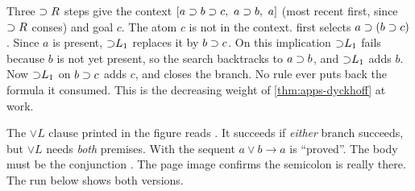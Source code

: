 \begin{tutorial}
Three $\supset R$ steps give the context $[a\supset b\supset c,\ a\supset b,\ a]$ (most recent first, since $\supset R$
conses) and goal $c$. The atom $c$ is not in the context.  first selects
$a\supset(b\supset c)$. Since $a$ is present, ${\supset}L_1$ replaces it by $b\supset c$. On this implication
${\supset}L_1$ fails because $b$ is not yet present, so the search backtracks to $a\supset b$, and ${\supset}L_1$
adds $b$. Now ${\supset}L_1$ on $b\supset c$ adds $c$, and  closes the branch. No rule ever puts
back the formula it consumed. This is the decreasing weight of \cref{thm:apps-dyckhoff} at work.
\end{tutorial}

\begin{pitfall}
The $\lor L$ clause printed in the figure reads . It succeeds if
\emph{either} branch succeeds, but $\lor L$ needs \emph{both} premises. With \lp{;} the sequent
$a\lor b\longrightarrow a$ is ``proved''. The body must be the conjunction
. The page image confirms the semicolon is really there. The run
below shows both versions.
\end{pitfall}

